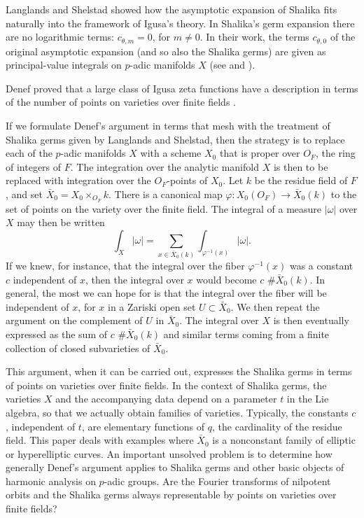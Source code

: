 \documentclass{amsart}
\begin{document}
Langlands and Shelstad
showed  how the asymptotic expansion of Shalika 
fits naturally into
the framework of Igusa's theory.  In Shalika's germ
expansion there are no logarithmic terms: $c_{\theta,m}=0$,
for $m\ne0$. In their work,
the terms $c_{\theta,0}$ of the
original asymptotic expansion (and so also the Shalika germs)
are given as principal-value integrals
on $p$-adic manifolds $X$ (see \cite{L} and \cite{H3}).

Denef proved that a large class of Igusa zeta functions have
a description in terms of the number of points on varieties over
finite fields \cite{D1}.

If we formulate Denef's argument in terms that mesh with 
the treatment 
of Shalika germs given by Langlands and Shelstad, 
then the strategy
is to replace each of the $p$-adic
manifolds $X$ with a scheme $X_0$ that is proper over
$O_F$, the ring of integers of $F$.  The integration over the
analytic manifold $X$ is then to be replaced
 with integration over the $O_F$-points
of $X_0$.  Let $k$ be the residue field of $F$, and set
$\bar X_0 = X_0\times_{O_F} k$.  There is a canonical map
$\varphi:X_0(O_F) \to \bar X_0(k)$ to the set of points on the
variety over the finite field.  The integral of a measure $|\omega|$
over $X$ may then be written
$$\int_X |\omega| = \sum_{x\in \bar X_0(k)} \int_{\varphi^{-1}(x)} |\omega|.$$
If we knew, for instance, that the integral over the fiber $\varphi^{-1}(x)$
was a constant $c$ independent of $x$, then the integral over $x$
would 
become $c\,\, \#\bar X_0(k)$.  In general, the most we can hope for is that
the integral over the fiber will be independent of $x$,
 for $x$ in a 
Zariski open set $U\subset \bar X_0$. We then
repeat the argument on the complement of $U$ in $\bar X_0$.
 The integral over $X$ is 
then eventually expressed as 
the
sum of $c\,\,\#\bar X_0(k)$ and similar terms coming from a finite collection
of closed subvarieties of $\bar X_0$. 

This argument, when it can be carried out, expresses the Shalika
germs in terms of points on varieties over finite fields.  In the context
of Shalika germs, the varieties $X$ 
and the accompanying data depend on a parameter $t$ in the
Lie algebra, so that we actually obtain families of varieties.
Typically, the constants $c$, independent of $t$, are elementary
functions of $q$, the cardinality of the residue field.
This
paper deals with examples where $\bar X_0$ is a nonconstant
family of elliptic or hyperelliptic curves.
An important unsolved problem is to determine how
generally Denef's argument applies
to Shalika germs and other
basic objects of harmonic analysis on $p$-adic groups.
Are the Fourier transforms of nilpotent orbits and the Shalika germs
always representable by points on varieties over finite fields?
\end{document}
